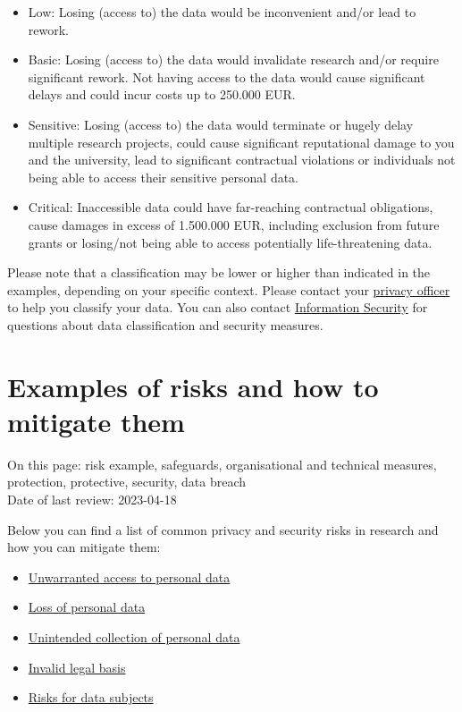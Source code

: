 \documentclass[
]{book}
\providecommand{\tightlist}{%
  \setlength{\itemsep}{0pt}\setlength{\parskip}{0pt}}
\begin{document}
\begin{itemize}
\tightlist
\item
  Low: Losing (access to) the data would be inconvenient and/or lead to rework.
\item
  Basic: Losing (access to) the data would invalidate research and/or require
  significant rework. Not having access to the data would cause significant delays
  and could incur costs up to 250.000 EUR.
\item
  Sensitive: Losing (access to) the data would terminate or hugely delay
  multiple research projects, could cause significant reputational damage to you
  and the university, lead to significant contractual violations or individuals
  not being able to access their sensitive personal data.
\item
  Critical: Inaccessible data could have far-reaching contractual obligations,
  cause damages in excess of 1.500.000 EUR, including exclusion from future grants
  or losing/not being able to access potentially life-threatening data.
\end{itemize}

Please note that a classification may be lower or higher than indicated in the
examples, depending on your specific context. Please contact your
\protect\hyperlink{support}{privacy officer} to help you classify your data. You can also
contact \protect\hyperlink{support}{Information Security} for questions about data classification
and security measures.

\hypertarget{example-risks}{%
\section{Examples of risks and how to mitigate them}\label{example-risks}}

On this page: risk example, safeguards, organisational and technical measures,
protection, protective, security, data breach\\
Date of last review: 2023-04-18

Below you can find a list of common privacy and security risks in research and
how you can mitigate them:

\begin{itemize}
\tightlist
\item
  \protect\hyperlink{unwarranted-access}{Unwarranted access to personal data}
\item
  \protect\hyperlink{loss-of-personal-data}{Loss of personal data}
\item
  \protect\hyperlink{unintended-collection}{Unintended collection of personal data}
\item
  \protect\hyperlink{invalid-legal-basis}{Invalid legal basis}
\item
  \protect\hyperlink{risks-data-subjects}{Risks for data subjects}
\end{itemize}
\end{document}
